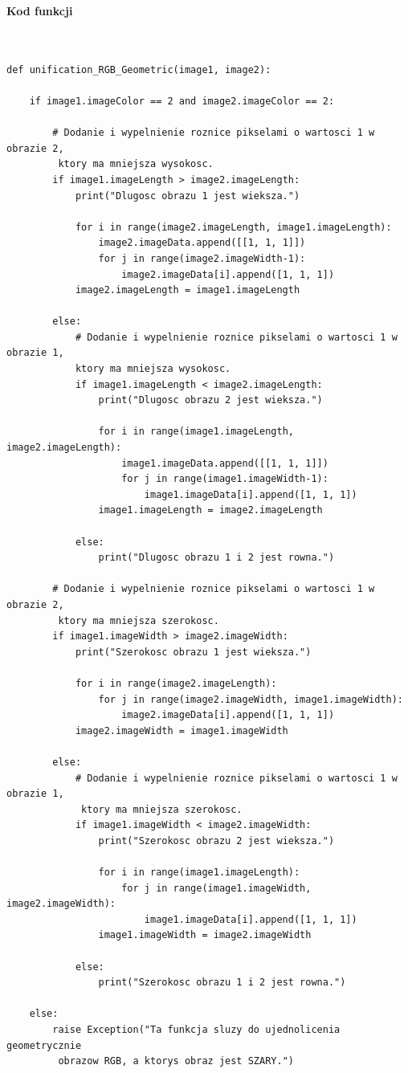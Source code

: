 \documentclass[magisterska,openany]{pracadypl}
\begin{document}
\newpage
\textbf{\Large Kod funkcji}
   
\lstset{language=Python}
\vspace{0.25cm}
\begin{lstlisting}[caption={Geometryczne ujednolicanie obrazów RGB}]


def unification_RGB_Geometric(image1, image2):

    if image1.imageColor == 2 and image2.imageColor == 2:

        # Dodanie i wypelnienie roznice pikselami o wartosci 1 w obrazie 2,
         ktory ma mniejsza wysokosc.
        if image1.imageLength > image2.imageLength:
            print("Dlugosc obrazu 1 jest wieksza.")

            for i in range(image2.imageLength, image1.imageLength):
                image2.imageData.append([[1, 1, 1]])
                for j in range(image2.imageWidth-1):
                    image2.imageData[i].append([1, 1, 1])
            image2.imageLength = image1.imageLength

        else:
            # Dodanie i wypelnienie roznice pikselami o wartosci 1 w obrazie 1,
            ktory ma mniejsza wysokosc.
            if image1.imageLength < image2.imageLength:
                print("Dlugosc obrazu 2 jest wieksza.")

                for i in range(image1.imageLength, image2.imageLength):
                    image1.imageData.append([[1, 1, 1]])
                    for j in range(image1.imageWidth-1):
                        image1.imageData[i].append([1, 1, 1])
                image1.imageLength = image2.imageLength

            else:
                print("Dlugosc obrazu 1 i 2 jest rowna.")

        # Dodanie i wypelnienie roznice pikselami o wartosci 1 w obrazie 2,
         ktory ma mniejsza szerokosc.
        if image1.imageWidth > image2.imageWidth:
            print("Szerokosc obrazu 1 jest wieksza.")

            for i in range(image2.imageLength):
                for j in range(image2.imageWidth, image1.imageWidth):
                    image2.imageData[i].append([1, 1, 1])
            image2.imageWidth = image1.imageWidth

        else:
            # Dodanie i wypelnienie roznice pikselami o wartosci 1 w obrazie 1,
             ktory ma mniejsza szerokosc.
            if image1.imageWidth < image2.imageWidth:
                print("Szerokosc obrazu 2 jest wieksza.")

                for i in range(image1.imageLength):
                    for j in range(image1.imageWidth, image2.imageWidth):
                        image1.imageData[i].append([1, 1, 1])
                image1.imageWidth = image2.imageWidth

            else:
                print("Szerokosc obrazu 1 i 2 jest rowna.")

    else:
        raise Exception("Ta funkcja sluzy do ujednolicenia geometrycznie
         obrazow RGB, a ktorys obraz jest SZARY.")

\end{lstlisting}
\newpage
\end{document}
